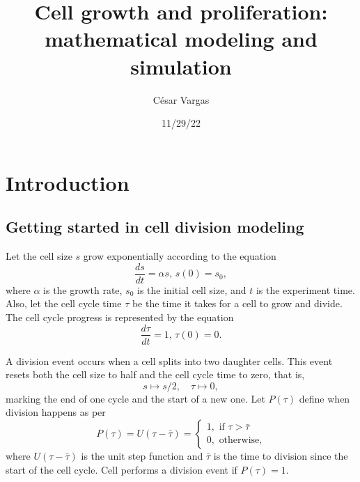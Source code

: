 \documentclass[
  letterpaper,
  DIV=11,
  numbers=noendperiod]{scrreprt}
\title{Cell growth and proliferation: mathematical modeling and
simulation}
\author{César Vargas}
\date{11/29/22}
\renewcommand*\contentsname{Table of contents}
\newcommand\contentsname{Table of contents}
\begin{document}
\maketitle
\ifdefined\Shaded\renewenvironment{Shaded}{\begin{tcolorbox}[interior hidden, boxrule=0pt, enhanced, borderline west={3pt}{0pt}{shadecolor}, frame hidden, sharp corners, breakable]}{\end{tcolorbox}}\fi

\renewcommand*\contentsname{Table of contents}
{
\hypersetup{linkcolor=}
\setcounter{tocdepth}{2}
\tableofcontents
}

\hypertarget{section}{%
\chapter{}\label{section}}


\hypertarget{introduction}{%
\chapter{Introduction}\label{introduction}}

\hypertarget{getting-started-in-cell-division-modeling}{%
\section{Getting started in cell division
modeling}\label{getting-started-in-cell-division-modeling}}

Let the cell size \(s\) grow exponentially according to the equation
\[\frac{ds}{dt}=\alpha s, \, s(0)=s_0,\] where \(\alpha\) is the growth
rate, \(s_0\) is the initial cell size, and \(t\) is the experiment
time. Also, let the cell cycle time \(\tau\) be the time it takes for a
cell to grow and divide. The cell cycle progress is represented by the
equation \[\frac{d\tau}{dt}=1, \, \tau(0)=0.\]

A division event occurs when a cell splits into two daughter cells. This
event resets both the cell size to half and the cell cycle time to zero,
that is, \[ s \mapsto s / 2, \quad \tau \mapsto 0,\] marking the end of
one cycle and the start of a new one. Let \(P(\tau)\) define when
division happens as per \[P(\tau)=U(\tau-\bar{\tau})=\begin{cases}
    1,  \text{ if } \tau > \bar{\tau} \\
    0,  \text{ otherwise,}
\end{cases}\] where \(U(\tau-\bar{\tau})\) is the unit step function and
\(\bar{\tau}\) is the time to division since the start of the cell
cycle. Cell performs a division event if \(P(\tau)=1\).
\end{document}
